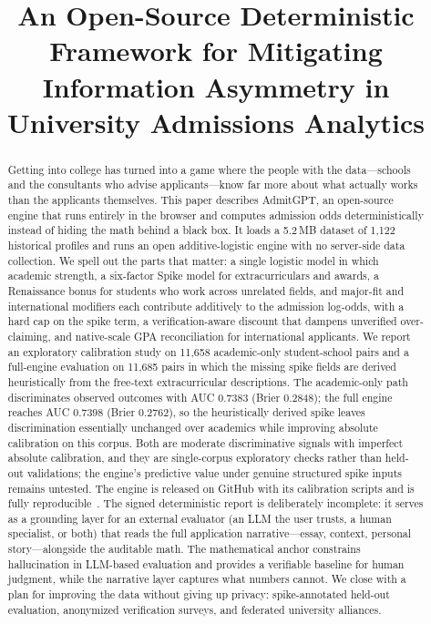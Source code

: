 \documentclass[conference]{IEEEtran}
\begin{document}
\title{An Open-Source Deterministic Framework for Mitigating Information Asymmetry in University Admissions Analytics}

\author{
}

\maketitle

\begin{abstract}
Getting into college has turned into a game where the people with the data---schools and the consultants who advise applicants---know far more about what actually works than the applicants themselves. This paper describes AdmitGPT, an open-source engine that runs entirely in the browser and computes admission odds deterministically instead of hiding the math behind a black box. It loads a 5.2\,MB dataset of 1,122 historical profiles and runs an open additive-logistic engine with no server-side data collection. We spell out the parts that matter: a single logistic model in which academic strength, a six-factor Spike model for extracurriculars and awards, a Renaissance bonus for students who work across unrelated fields, and major-fit and international modifiers each contribute additively to the admission log-odds, with a hard cap on the spike term, a verification-aware discount that dampens unverified over-claiming, and native-scale GPA reconciliation for international applicants. We report an exploratory calibration study on 11,658 academic-only student-school pairs and a full-engine evaluation on 11,685 pairs in which the missing spike fields are derived heuristically from the free-text extracurricular descriptions. The academic-only path discriminates observed outcomes with AUC 0.7383 (Brier 0.2848); the full engine reaches AUC 0.7398 (Brier 0.2762), so the heuristically derived spike leaves discrimination essentially unchanged over academics while improving absolute calibration on this corpus. Both are moderate discriminative signals with imperfect absolute calibration, and they are single-corpus exploratory checks rather than held-out validations; the engine's predictive value under genuine structured spike inputs remains untested. The engine is released on GitHub with its calibration scripts and is fully reproducible~\cite{admitgpt}. The signed deterministic report is deliberately incomplete: it serves as a grounding layer for an external evaluator (an LLM the user trusts, a human specialist, or both) that reads the full application narrative---essay, context, personal story---alongside the auditable math. The mathematical anchor constrains hallucination in LLM-based evaluation and provides a verifiable baseline for human judgment, while the narrative layer captures what numbers cannot. We close with a plan for improving the data without giving up privacy: spike-annotated held-out evaluation, anonymized verification surveys, and federated university alliances.
\end{abstract}
\end{document}
